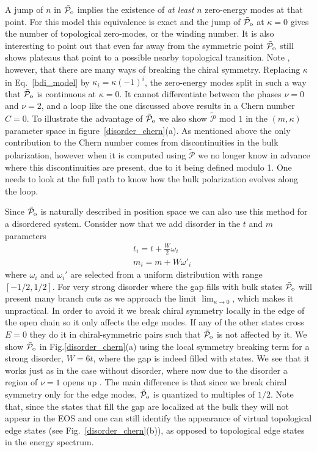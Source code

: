 \documentclass[twocolumn,amsmath,longbibliography,amssymb,superscriptaddress]{revtex4-1}
\newcommand{\tpo}{\tilde{\mathcal{P}}_{\rm o}}
\begin{document}
A jump of $n$ in $\tpo$ implies the existence of \emph{at least} $n$ zero-energy modes at that point. For this model this equivalence is exact and the jump of $\tpo$ at $\kappa = 0$ gives the number of topological zero-modes, or the winding number. It is also interesting to point out that even far away from the symmetric point $\tpo$ still shows plateaus that point to a possible nearby topological transition.
Note , however, that there are many ways of breaking the chiral symmetry. Replacing $\kappa$ in Eq.~\eqref{bdi_model} by $\kappa_i=\kappa (-1)^i$, the zero-energy modes split in such a way that $\tpo$ is continuous at $\kappa=0$. It cannot differentiate between the phases $\nu=0$ and $\nu=2$, and a loop like the one discussed above results in a Chern number $C=0$. To illustrate the advantage of $\tpo$ we also show $\tilde{\mathcal{P}}$ mod $1$ in the $(m,\kappa)$ parameter space in figure~\ref{disorder_chern}(a). As mentioned above the only contribution to the Chern number comes from discontinuities in the bulk polarization, however when it is computed using $\tilde{\mathcal{P}}$ we no longer know in advance where this discontinuities are present, due to it being defined modulo 1. One needs to look at the full path to know how the bulk polarization evolves along the loop. 

Since $\tpo$ is naturally described in position space we can also use this method for a disordered system. Consider now that we add disorder in the $t$ and $m$ parameters
\begin{align}
&t_i = t + \frac{W}{2} \omega_i \nonumber\\
&m_i = m + W \omega'_i
\end{align}
where $\omega_i$ and $\omega_i'$ are selected from a uniform distribution with range $[-1/2,1/2]$. For very strong disorder where the gap fills with bulk states $\tpo$ will present many branch cuts as we approach the limit $\lim_{\kappa \rightarrow 0}$, which makes it unpractical. In order to avoid it we break chiral symmetry locally in the edge of the open chain so it only affects the edge modes. If any of the other states cross $E=0$ they do it in  chiral-symmetric pairs such that $\tpo$ is not affected by it. We show $\tpo$ in Fig.\ref{disorder_chern}(a) using the local symmetry breaking term for a strong disorder, $W=6t$, where the gap is indeed filled with states. We see that it works just as in the case without disorder, where now due to the disorder a region of $\nu=1$ opens up \cite{Song2014}. The main difference is that since we break chiral symmetry only for the edge modes, $\tpo$ is quantized to multiples of $1/2$. Note that, since the states that fill the gap are localized at the bulk they will not appear in the EOS and one can still identify the appearance of virtual topological edge states (see Fig.~\ref{disorder_chern}(b)), as opposed to topological edge states in the energy spectrum.
\end{document}

